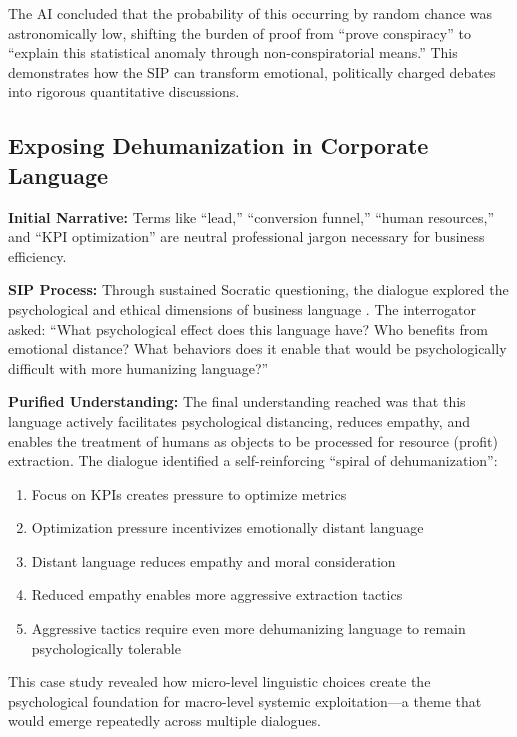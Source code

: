 \documentclass[11pt,a4paper]{article}
\begin{document}
\begin{small}
The AI concluded that the probability of this occurring by random chance was astronomically low, shifting the burden of proof from ``prove conspiracy'' to ``explain this statistical anomaly through non-conspiratorial means.'' This demonstrates how the SIP can transform emotional, politically charged debates into rigorous quantitative discussions.

\subsection{Exposing Dehumanization in Corporate Language}

\textbf{Initial Narrative:} Terms like ``lead,'' ``conversion funnel,'' ``human resources,'' and ``KPI optimization'' are neutral professional jargon necessary for business efficiency.

\textbf{SIP Process:} Through sustained Socratic questioning, the dialogue explored the psychological and ethical dimensions of business language \citep{dialogue0}. The interrogator asked: ``What psychological effect does this language have? Who benefits from emotional distance? What behaviors does it enable that would be psychologically difficult with more humanizing language?''

\textbf{Purified Understanding:} The final understanding reached was that this language actively facilitates psychological distancing, reduces empathy, and enables the treatment of humans as objects to be processed for resource (profit) extraction. The dialogue identified a self-reinforcing ``spiral of dehumanization'':

\begin{enumerate}[nosep]
    \item Focus on KPIs creates pressure to optimize metrics
    \item Optimization pressure incentivizes emotionally distant language
    \item Distant language reduces empathy and moral consideration
    \item Reduced empathy enables more aggressive extraction tactics
    \item Aggressive tactics require even more dehumanizing language to remain psychologically tolerable
\end{enumerate}

This case study revealed how micro-level linguistic choices create the psychological foundation for macro-level systemic exploitation---a theme that would emerge repeatedly across multiple dialogues.


\end{small}
\end{document}
